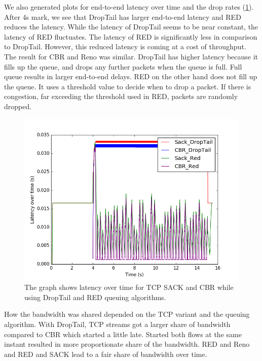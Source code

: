 We also generated plots for end-to-end latency over time and the drop rates (\ref{fig:Queuing_Latency_Sack_100}). After 4s mark, we see that DropTail has larger end-to-end latency and RED reduces the latency. While the latency of DropTail seems to be near constant, the latency of RED fluctuates. The latency of RED is significantly less in comparison to DropTail. However, this reduced latency is coming at a cost of throughput. The result for CBR and Reno was similar. DropTail has higher latency because it fills up the queue, and drops any further packets when the queue is full. Full queue results in larger end-to-end delays. RED on the other hand  does not fill up the queue. It uses a threshold value to decide when to drop a packet. If there is congestion, far exceeding the threshold used in RED, packets are randomly dropped.
\begin{figure}[!htbp]
	\includegraphics[scale=0.4]{Queuing_Latency_Sack_100.png}
	\caption{The graph shows latency over time for TCP SACK and CBR while using DropTail and RED queuing algorithms.}
	\label{fig:Queuing_Latency_Sack_100}
\end{figure}
How the bandwidth was shared depended on the TCP variant and the queuing algorithm. With DropTail, TCP streams got a larger share of bandwidth compared to CBR which started a little late. Started both flows at the same instant resulted in more proportionate share of the bandwidth. RED and Reno and RED and SACK lead to a fair share of bandwidth over time.


